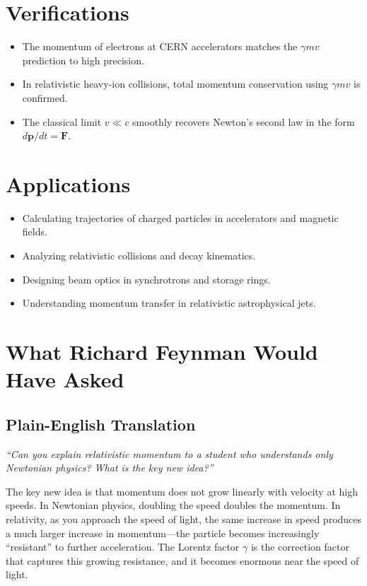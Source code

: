 \documentclass[11pt,openright]{book}
\begin{document}
\section*{Verifications}

\begin{itemize}
    \item The momentum of electrons at CERN accelerators matches the $\gamma m v$ prediction to high precision.
    \item In relativistic heavy-ion collisions, total momentum conservation using $\gamma m v$ is confirmed.
    \item The classical limit $v \ll c$ smoothly recovers Newton's second law in the form $d\mathbf{p}/dt = \mathbf{F}$.
\end{itemize}
\section*{Applications}

\begin{itemize}
    \item Calculating trajectories of charged particles in accelerators and magnetic fields.
    \item Analyzing relativistic collisions and decay kinematics.
    \item Designing beam optics in synchrotrons and storage rings.
    \item Understanding momentum transfer in relativistic astrophysical jets.
\end{itemize}
\section*{What Richard Feynman Would Have Asked}

\subsection*{Plain-English Translation}
\textit{``Can you explain relativistic momentum to a student who understands only Newtonian physics? What is the key new idea?''}

The key new idea is that momentum does not grow linearly with velocity at high speeds. In Newtonian physics, doubling the speed doubles the momentum. In relativity, as you approach the speed of light, the same increase in speed produces a much larger increase in momentum---the particle becomes increasingly ``resistant'' to further acceleration. The Lorentz factor $\gamma$ is the correction factor that captures this growing resistance, and it becomes enormous near the speed of light.
\end{document}
